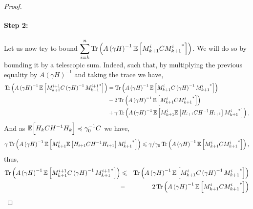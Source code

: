 \begin{proof}
\paragraph{Step 2: } Let us now try to bound $\displaystyle \sum_{i=k}^n \operatorname{Tr}\left( A \left(\gamma H\right)^{-1}{\mathbb E} \left[    M^i_{k+1} C {M^i_{k+1}}^*\right] \right)$. We will do so by bounding it by a telescopic sum. Indeed,
such that, by multiplying the previous equality by $A \left(\gamma H\right)^{-1}$ and taking the trace we have, 
\begin{align*}
\operatorname{Tr}\left( A \left(\gamma H\right)^{-1}{\mathbb E} \left[  {M^{i+1}_{k+1}}C\left(\gamma H\right)^{-1}{M^{i+1}_{k+1}}^*\right]\right) &=  \operatorname{Tr}\left(A \left(\gamma H\right)^{-1}{\mathbb E} \left[  {M^{i}_{k+1}}C\left(\gamma H\right)^{-1}{M^{i}_{k+1}}^*\right]\right)\\
 &-2\operatorname{Tr}\left(A \left(\gamma H\right)^{-1}{\mathbb E} \left[  {M^{i}_{k+1}}C{M^{i}_{k+1}}^*\right]\right) \\
&+ \gamma \operatorname{Tr}\left(A \left(\gamma H\right)^{-1}{\mathbb E} \left[  {M^{i}_{k+1}}{\mathbb E} \left[ H_{i+1}CH^{-1}H_{i+1} \right]{M^{i}_{k+1}}^*\right]\right),
\end{align*}
And as ${\mathbb E} \Big[  H_k C H^{-1} H_k \Big] \preccurlyeq \gamma_0^{-1} C$ we have, 
$$\gamma\operatorname{Tr}\left(A \left(\gamma H\right)^{-1} {\mathbb E} \left[  {M^{i}_{k+1}}{\mathbb E} \left[ H_{i+1}CH^{-1}H_{i+1} \right]{M^{i}_{k+1}}^*\right]\right) \leqslant \gamma / \gamma_0 \operatorname{Tr}\left(A \left(\gamma H\right)^{-1} {\mathbb E} \left[  {M^{i}_{k+1}}C{M^{i}_{k+1}}^*\right]\right), $$
thus,
\begin{eqnarray*}
\tr\left(A \left(\gamma H\right)^{-1} \E \left[ {M^{i+1}_{k+1}}C\left(\gamma H\right)^{-1}{M^{i+1}_{k+1}}^*\right]\right) &\leqslant&  \tr\left(A \left(\gamma H\right)^{-1}\E \left[  {M^{i}_{k+1}}C\left(\gamma H\right)^{-1}{M^{i}_{k+1}}^*\right]\right) \\
&-&2\tr\left(A \left(\gamma H\right)^{-1}\E \left[  {M^{i}_{k+1}}C{M^{i}_{k+1}}^*\right]\right) \\

\end{eqnarray*}
\end{proof}
